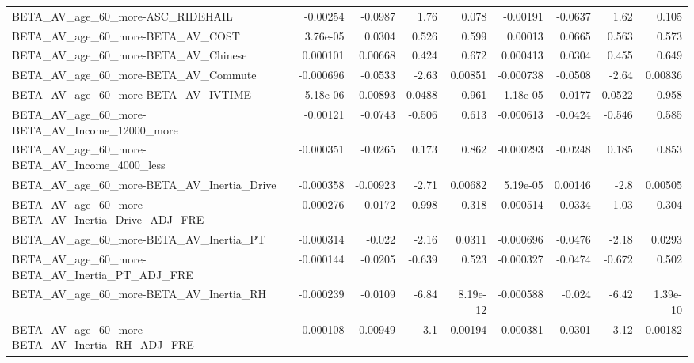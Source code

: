 \begin{tabular}{lrrrrrrrr}
BETA\_AV\_age\_60\_more-ASC\_RIDEHAIL                   &    -0.00254 &      -0.0987 &     1.76 &    0.078 &   -0.00191 &     -0.0637 &         1.62 &         0.105 \\
BETA\_AV\_age\_60\_more-BETA\_AV\_COST                   &    3.76e-05 &       0.0304 &    0.526 &    0.599 &    0.00013 &      0.0665 &        0.563 &         0.573 \\
BETA\_AV\_age\_60\_more-BETA\_AV\_Chinese                &    0.000101 &      0.00668 &    0.424 &    0.672 &   0.000413 &      0.0304 &        0.455 &         0.649 \\
BETA\_AV\_age\_60\_more-BETA\_AV\_Commute                &   -0.000696 &      -0.0533 &    -2.63 &  0.00851 &  -0.000738 &     -0.0508 &        -2.64 &       0.00836 \\
BETA\_AV\_age\_60\_more-BETA\_AV\_IVTIME                 &    5.18e-06 &      0.00893 &   0.0488 &    0.961 &   1.18e-05 &      0.0177 &       0.0522 &         0.958 \\
BETA\_AV\_age\_60\_more-BETA\_AV\_Income\_12000\_more      &    -0.00121 &      -0.0743 &   -0.506 &    0.613 &  -0.000613 &     -0.0424 &       -0.546 &         0.585 \\
BETA\_AV\_age\_60\_more-BETA\_AV\_Income\_4000\_less       &   -0.000351 &      -0.0265 &    0.173 &    0.862 &  -0.000293 &     -0.0248 &        0.185 &         0.853 \\
BETA\_AV\_age\_60\_more-BETA\_AV\_Inertia\_Drive          &   -0.000358 &     -0.00923 &    -2.71 &  0.00682 &   5.19e-05 &     0.00146 &         -2.8 &       0.00505 \\
BETA\_AV\_age\_60\_more-BETA\_AV\_Inertia\_Drive\_ADJ\_FRE  &   -0.000276 &      -0.0172 &   -0.998 &    0.318 &  -0.000514 &     -0.0334 &        -1.03 &         0.304 \\
BETA\_AV\_age\_60\_more-BETA\_AV\_Inertia\_PT             &   -0.000314 &       -0.022 &    -2.16 &   0.0311 &  -0.000696 &     -0.0476 &        -2.18 &        0.0293 \\
BETA\_AV\_age\_60\_more-BETA\_AV\_Inertia\_PT\_ADJ\_FRE     &   -0.000144 &      -0.0205 &   -0.639 &    0.523 &  -0.000327 &     -0.0474 &       -0.672 &         0.502 \\
BETA\_AV\_age\_60\_more-BETA\_AV\_Inertia\_RH             &   -0.000239 &      -0.0109 &    -6.84 & 8.19e-12 &  -0.000588 &      -0.024 &        -6.42 &      1.39e-10 \\
BETA\_AV\_age\_60\_more-BETA\_AV\_Inertia\_RH\_ADJ\_FRE     &   -0.000108 &     -0.00949 &     -3.1 &  0.00194 &  -0.000381 &     -0.0301 &        -3.12 &       0.00182 \\

\end{tabular}

